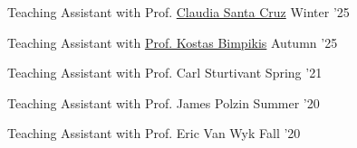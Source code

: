 
    

\begin{cvpubs}
\end{cvpubs}

\begin{cvhonors}
\cvhonor
{}
{Teaching Assistant with Prof. \href{https://www.gsb.stanford.edu/faculty-research/faculty/claudia-allende-santa-cruz}{Claudia Santa Cruz}}
{}
{Winter '25}
\end{cvhonors}

\begin{cvhonors}
\cvhonor
{}
{Teaching Assistant with \href{https://stanford.edu/~kostasb/}{Prof. Kostas Bimpikis}}
{}
{Autumn '25}
\end{cvhonors}

\begin{cvhonors}
\cvhonor
{}
{Teaching Assistant with Prof. Carl Sturtivant}
{}
{Spring '21}
\end{cvhonors}


\begin{cvhonors}

\cvhonor
{}
{Teaching Assistant with Prof. James Polzin}
{}
{Summer '20}
\end{cvhonors}


\begin{cvhonors}
\cvhonor
{}
{Teaching Assistant with Prof. Eric Van Wyk}
{}
{Fall '20}
\end{cvhonors}

